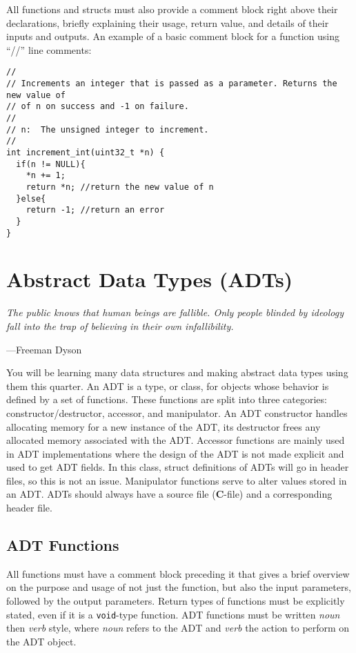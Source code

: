 \documentclass[11pt]{article}
\begin{document}
All functions and structs must also provide a comment block right above
their declarations, briefly explaining their usage, return value, and details
of their inputs and outputs. An example of a basic comment block for a function
using ``//'' line comments:

\begin{lstlisting}
//
// Increments an integer that is passed as a parameter. Returns the new value of
// of n on success and -1 on failure.
//
// n:  The unsigned integer to increment.
//
int increment_int(uint32_t *n) {
  if(n != NULL){
    *n += 1;
    return *n; //return the new value of n
  }else{
    return -1; //return an error
  }
}
\end{lstlisting}


\section{Abstract Data Types (ADTs)}
\epigraph{\emph{The public knows that human beings are fallible. Only
people blinded by ideology fall into the trap of believing in their
own infallibility.}}{---Freeman Dyson}

\noindent
You will be learning many data structures and making abstract data types using
them this quarter. An ADT is a type, or class, for objects whose behavior is
defined by a set of functions. These functions are split into three categories:
constructor/destructor, accessor, and manipulator. An ADT constructor handles
allocating memory for a new instance of the ADT, its destructor frees any
allocated memory associated with the ADT. Accessor functions are mainly used in
ADT implementations where the design of the ADT is not made explicit and used to
get ADT fields. In this class, struct definitions of ADTs will go in header
files, so this is not an issue. Manipulator functions serve to alter values
stored in an ADT. ADTs should always have a source file (\textbf{C}-file) and a
corresponding header file.

\subsection{ADT Functions}
All functions must have a comment block preceding it that gives a brief overview
on the purpose and usage of not just the function, but also the input parameters, followed by the output
parameters. Return types of functions must be
explicitly stated, even if it is a \texttt{void}-type function. ADT functions must be
written \emph{noun} then \emph{verb} style, where \emph{noun} refers to the
ADT and \emph{verb} the action to perform on the ADT object.
\end{document}
